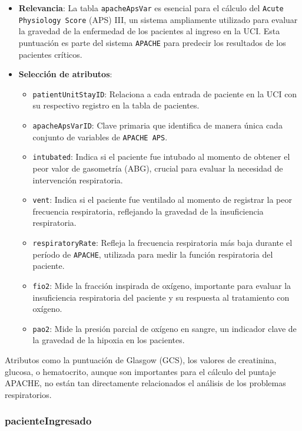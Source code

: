 \documentclass[12pt, a4paper, twoside]{article}
\begin{document}
	\begin{itemize}
		\item \textbf{Relevancia}: La tabla \texttt{apacheApsVar} es esencial para el cálculo del \texttt{Acute Physiology Score} (APS) III, un sistema ampliamente utilizado para evaluar la gravedad de la enfermedad de los pacientes al ingreso en la UCI. Esta puntuación es parte del sistema \texttt{APACHE} para predecir los resultados de los pacientes críticos.
		
		\item \textbf{Selección de atributos}:
		\begin{itemize}
			\item \texttt{patientUnitStayID}: Relaciona a cada entrada de paciente en la UCI con su respectivo registro en la tabla de pacientes.
			\item \texttt{apacheApsVarID}: Clave primaria que identifica de manera única cada conjunto de variables de \texttt{APACHE APS}.
			\item \texttt{intubated}: Indica si el paciente fue intubado al momento de obtener el peor valor de gasometría (ABG), crucial para evaluar la necesidad de intervención respiratoria.
			\item \texttt{vent}: Indica si el paciente fue ventilado al momento de registrar la peor frecuencia respiratoria, reflejando la gravedad de la insuficiencia respiratoria.
			\item \texttt{respiratoryRate}: Refleja la frecuencia respiratoria más baja durante el período de \texttt{APACHE}, utilizada para medir la función respiratoria del paciente.
			\item \texttt{fio2}: Mide la fracción inspirada de oxígeno, importante para evaluar la insuficiencia respiratoria del paciente y su respuesta al tratamiento con oxígeno.
			\item \texttt{pao2}: Mide la presión parcial de oxígeno en sangre, un indicador clave de la gravedad de la hipoxia en los pacientes.
		\end{itemize}
		
	\end{itemize}
	
	Atributos como la puntuación de Glasgow (GCS), los valores de creatinina, glucosa, o hematocrito, aunque son importantes para el cálculo del puntaje APACHE, no están tan directamente relacionados el análisis de los problemas respiratorios.  \cite{eICU2024}
	
	\subsubsection{pacienteIngresado}
	
\end{document}
